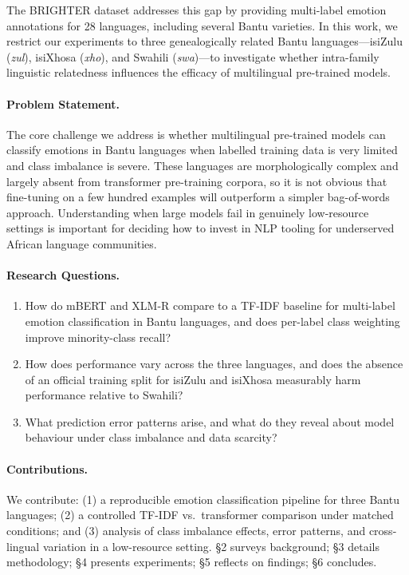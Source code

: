\documentclass[11pt]{article}
\begin{document}
The BRIGHTER dataset \citep{abdulmumin2024brighter} addresses this gap by
providing multi-label emotion annotations for 28 languages, including several
Bantu varieties.
In this work, we restrict our experiments to three genealogically related
Bantu languages---isiZulu (\textit{zul}), isiXhosa (\textit{xho}), and
Swahili (\textit{swa})---to investigate whether intra-family linguistic
relatedness influences the efficacy of multilingual pre-trained models.

\paragraph{Problem Statement.}
The core challenge we address is whether multilingual pre-trained models can
classify emotions in Bantu languages when labelled training data is very
limited and class imbalance is severe.
These languages are morphologically complex and largely absent from transformer
pre-training corpora, so it is not obvious that fine-tuning on a few hundred
examples will outperform a simpler bag-of-words approach.
Understanding when large models fail in genuinely low-resource settings is
important for deciding how to invest in NLP tooling for underserved African
language communities.

\paragraph{Research Questions.}
\begin{enumerate}[noitemsep]
  \item How do mBERT and XLM-R compare to a TF-IDF baseline for multi-label
        emotion classification in Bantu languages, and does per-label class
        weighting improve minority-class recall?
  \item How does performance vary across the three languages, and does the
        absence of an official training split for isiZulu and isiXhosa
        measurably harm performance relative to Swahili?
  \item What prediction error patterns arise, and what do they reveal about
        model behaviour under class imbalance and data scarcity?
\end{enumerate}

\paragraph{Contributions.}
We contribute: (1) a reproducible emotion classification pipeline for three
Bantu languages; (2) a controlled TF-IDF vs.\ transformer comparison under
matched conditions; and (3) analysis of class imbalance effects, error
patterns, and cross-lingual variation in a low-resource setting.
\S2 surveys background; \S3 details methodology; \S4 presents experiments;
\S5 reflects on findings; \S6 concludes.
\end{document}

